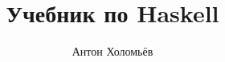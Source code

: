 
\author{Антон Холомьёв}
\title{Учебник по Haskell}

\clearpage{\pagestyle{empty}\clearpage}
\pagestyle{fancy}
\fancyhf{}

\titleGM
\clearpage{\pagestyle{empty}\clearpage}
\renewcommand{\headrulewidth}{0pt}
\Copyleft
\clearpage


